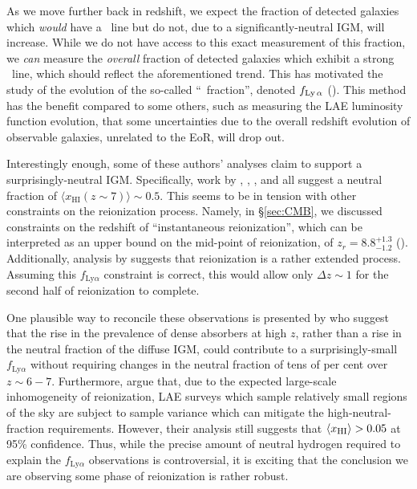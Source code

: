 As we move further back in redshift, we expect the fraction of detected galaxies which \textit{would} have a \lya\ line but do not, due to a significantly-neutral IGM, will increase. While we do not have access to this exact measurement of this fraction, we \textit{can} measure the \textit{overall} fraction of detected galaxies which exhibit a strong \lya\ line, which should reflect the aforementioned trend. This has motivated the study of the evolution of the so-called ``\lya\ fraction'', denoted $f_{\text{Ly$\,\alpha$}}$ (\citealt{Schenker2012,pentericci2011spectroscopic,Pentericci:2014nia,caruana2012no,caruana2014spectroscopy}). This method has the benefit compared to some others, such as measuring the LAE luminosity function evolution, that some uncertainties due to the overall redshift evolution of observable galaxies, unrelated to the EoR, will drop out. 


Interestingly enough, some of these authors' analyses claim to support a surprisingly-neutral IGM. Specifically, work by \citet{caruana2014spectroscopy}, \citet{Pentericci:2014nia}, \citet{pentericci2011spectroscopic}, and \citet{Schenker2012} all suggest a neutral fraction of $\langle x_{\text{HI}}(z \sim 7) \rangle \sim 0.5$. This seems to be in tension with other constraints on the reionization process. Namely, in \S \ref{sec:CMB}, we discussed constraints on the redshift of ``instantaneous reionization'', which can be interpreted as an upper bound on the mid-point of reionization, of $z_{r} = 8.8^{+1.3}_{-1.2}$ (\citet{planck2015planck}). Additionally, analysis by \citet{Bolton:2007b} suggests that reionization is a rather extended process. Assuming this $f_{\text{Ly}\alpha}$ constraint is correct, this would allow only $\Delta z \sim 1$ for the second half of reionization to complete. 


One plausible way to reconcile these observations is presented by \citet{2013MNRAS.429.1695B} who suggest that the rise in the prevalence of dense absorbers at high $z$, rather than a rise in the neutral fraction of the diffuse IGM, could contribute to a surprisingly-small $f_{\text{Ly}\alpha}$ without requiring changes in the neutral fraction of tens of per cent over $z \sim 6-7$. Furthermore, \citet{Taylor:2013qia} argue that, due to the expected large-scale inhomogeneity of reionization, LAE surveys which sample relatively small regions of the sky are subject to sample variance which can mitigate the high-neutral-fraction requirements. However, their analysis still suggests that $\langle x_{\text{HI}}\rangle > 0.05$ at 95\% confidence. Thus, while the precise amount of neutral hydrogen required to explain the $f_{\text{Ly}\alpha}$ observations is controversial, it is exciting that the conclusion we are observing some phase of reionization is rather robust. 

